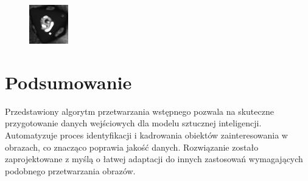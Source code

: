 \begin{figure}[H]
    \centering
    \includegraphics[width=0.25\linewidth]{chapters/04-czytanie/figures/blask_proc}
    \caption{}
    \label{fig:blaskproc}
\end{figure}



\section{Podsumowanie}

Przedstawiony algorytm przetwarzania wstępnego pozwala na skuteczne przygotowanie danych wejściowych dla modelu sztucznej inteligencji.
Automatyzuje proces identyfikacji i kadrowania obiektów zainteresowania w obrazach, co znacząco poprawia jakość danych.
Rozwiązanie zostało zaprojektowane z myślą o łatwej adaptacji do innych zastosowań wymagających podobnego przetwarzania obrazów.

